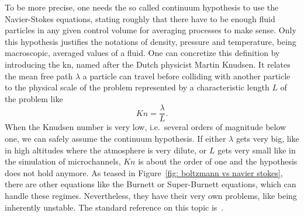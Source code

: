 To be more precise, one needs the so called continuum hypothesis to use the Navier-Stokes equations, stating roughly that there have to be enough fluid particles in any given control volume for averaging processes to make sense.
Only this hypothesis justifies the notations of density, pressure and temperature, being macroscopic, averaged values of a fluid.
One can concretize this definition by introducing the \gls{kn}, named after the Dutch physicist Martin Knudsen.
It relates the mean free path $\lambda$ a particle can travel before colliding with another particle to the physical scale of the problem represented by a characteristic length $L$ of the problem like
\begin{equation}
  \label{eq: definition of knudsen number}
  Kn=\frac{\lambda}{L}.
\end{equation}
When the Knudsen number is very low, i.e.\ several orders of magnitude below one, we can safely assume the continuum hypothesis.
If either $\lambda$ gets very big, like in high altitudes where the atmosphere is very dilute, or $L$ gets very small like in the simulation of microchannels, $Kn$ is about the order of one and the hypothesis does not hold anymore.
As teased in Figure~\ref{fig: boltzmann vs navier stokes}, there are other equations like the Burnett or Super-Burnett equations, which can handle these regimes.
Nevertheless, they have their very own problems, like being inherently unstable.
The standard reference on this topic is~\cite{agarwal2001beyond}.
